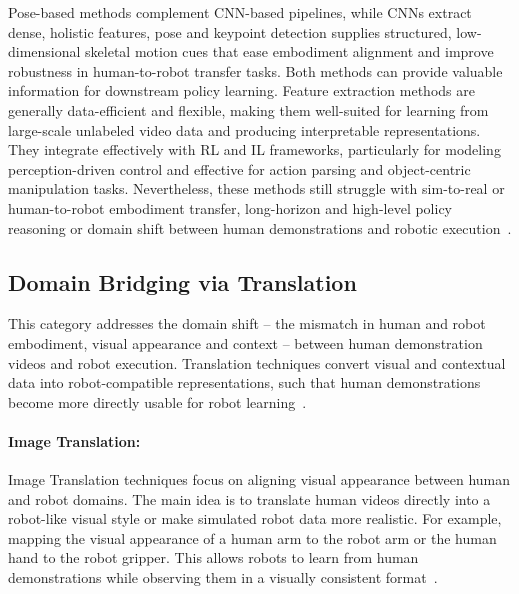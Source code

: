 Pose-based methods complement \ac{CNN}-based pipelines, while \acp{CNN} extract dense, holistic features, pose and keypoint detection supplies structured, low-dimensional skeletal motion cues that ease embodiment alignment and improve robustness in human-to-robot transfer tasks. Both methods can provide valuable information for downstream policy learning. 
Feature extraction methods are generally data-efficient and flexible, making them well-suited for learning from large-scale unlabeled video data and producing interpretable representations. They integrate effectively with \ac{RL} and \ac{IL} frameworks, particularly for modeling perception-driven control and effective for action parsing and object-centric manipulation tasks. 
Nevertheless, these methods still struggle with sim-to-real or human-to-robot embodiment transfer, long-horizon and high-level policy reasoning or domain shift between human demonstrations and robotic execution~\cite{Eze2024LearningBW}.





\subsection{Domain Bridging via Translation}
This category addresses the domain shift -- the mismatch in human and robot embodiment, visual appearance and context -- between human demonstration videos and robot execution. Translation techniques convert visual and contextual data into robot-compatible representations, such that human demonstrations become more directly usable for robot learning~\cite{Eze2024LearningBW}. 

\paragraph{Image Translation:}
    Image Translation techniques focus on aligning visual appearance between human and robot domains. The main idea is to translate human videos directly into a robot-like visual style or make simulated robot data more realistic. For example, mapping the visual appearance of a human arm to the robot arm or the human hand to the robot gripper. This allows robots to learn from human demonstrations while observing them in a visually consistent format~\cite{Eze2024LearningBW}.

